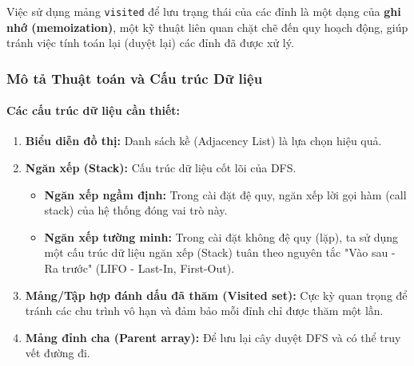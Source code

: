 \documentclass[a4paper,12pt]{article}
\begin{document}
Việc sử dụng mảng \texttt{visited} để lưu trạng thái của các đỉnh là một dạng của \textbf{ghi nhớ (memoization)}, một kỹ thuật liên quan chặt chẽ đến quy hoạch động, giúp tránh việc tính toán lại (duyệt lại) các đỉnh đã được xử lý.

\subsubsection{Mô tả Thuật toán và Cấu trúc Dữ liệu}
\paragraph{Các cấu trúc dữ liệu cần thiết:}
\begin{enumerate}
    \item \textbf{Biểu diễn đồ thị:} Danh sách kề (Adjacency List) là lựa chọn hiệu quả.
    \item \textbf{Ngăn xếp (Stack):} Cấu trúc dữ liệu cốt lõi của DFS.
        \begin{itemize}
            \item \textbf{Ngăn xếp ngầm định:} Trong cài đặt đệ quy, ngăn xếp lời gọi hàm (call stack) của hệ thống đóng vai trò này.
            \item \textbf{Ngăn xếp tường minh:} Trong cài đặt không đệ quy (lặp), ta sử dụng một cấu trúc dữ liệu ngăn xếp (Stack) tuân theo nguyên tắc "Vào sau - Ra trước" (LIFO - Last-In, First-Out).
        \end{itemize}
    \item \textbf{Mảng/Tập hợp đánh dấu đã thăm (Visited set):} Cực kỳ quan trọng để tránh các chu trình vô hạn và đảm bảo mỗi đỉnh chỉ được thăm một lần.
    \item \textbf{Mảng đỉnh cha (Parent array):} Để lưu lại cây duyệt DFS và có thể truy vết đường đi.
\end{enumerate}
\end{document}
